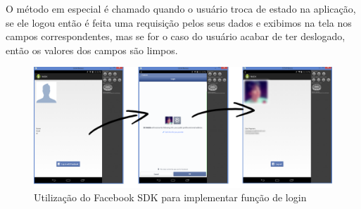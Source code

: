 \documentclass[a4paper,12pt,brazil,oneside]{book}
\begin{document}
	O método em especial é chamado quando o usuário troca de estado na aplicação, se ele logou então é feita uma requisição pelos seus dados e exibimos na tela nos campos correspondentes, mas se for o caso do usuário acabar de ter deslogado, então os valores dos campos são limpos.
	
	\begin{figure}[H]
  \centering
  \includegraphics[width=1\textwidth]{figuras/facebook/face.png}
  \caption{Utilização do Facebook SDK para implementar função de login}
  \label{fig:facebookLogin}
\end{figure}

\singlespace
{}
\cleardoublepage
\thispagestyle{empty}
{}


\doublespace
\end{document}

